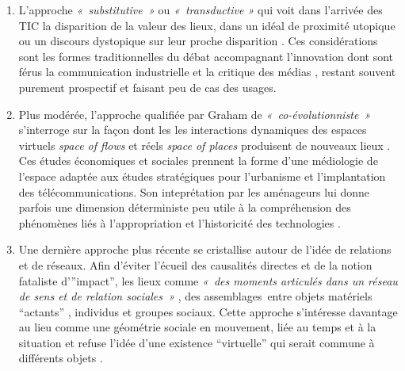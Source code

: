 \begin{enumerate}

\item L’approche \textit{« substitutive »} ou \textit{« transductive »} qui voit dans l’arrivée des TIC la disparition de la valeur des lieux, dans un idéal de proximité utopique \citep{McLuhan1962} ou un discours dystopique sur leur proche disparition \citep{Virilio1998, Augé1995}. Ces considérations sont les formes traditionnelles du débat accompagnant l’innovation dont sont férus la communication industrielle et la critique des médias \citep{Ramonet2001}, restant souvent purement prospectif et faisant peu de cas des usages.

\item Plus modérée, l’approche qualifiée par Graham de \textit{« co-évolutionniste »} s’interroge sur la façon dont les les interactions dynamiques des espaces virtuels \textit{space of flows} et réels \textit{space of places} \citep{Castells2009} produisent de nouveaux lieux . Ces études économiques et sociales prennent la forme d’une médiologie de l’espace adaptée aux études stratégiques pour l’urbanisme et l’implantation des télécommunications. Son inteprétation par les aménageurs lui donne parfois une dimension déterministe peu utile à la compréhension des phénomènes liés à l’appropriation et l’historicité des technologies \citep{Offner1993}.

\item Une dernière approche plus récente se cristallise autour de l’idée de relations et de réseaux. Afin d’éviter l’écueil des causalités directes et de la notion fataliste d’”impact”, les lieux comme \textit{« des moments articulés dans un réseau de sens et de relation sociales »} \citep{Massey1993}, des assemblages entre objets matériels “actants” \citep{Latour1996}, individus et groupes sociaux. Cette approche s’intéresse davantage au lieu comme une géométrie sociale en mouvement, liée au temps et à la situation \citep{Thrift2001} et refuse l’idée d’une existence “virtuelle” qui serait commune à différents objets \citep{Bingham1996}.

\end{enumerate}

